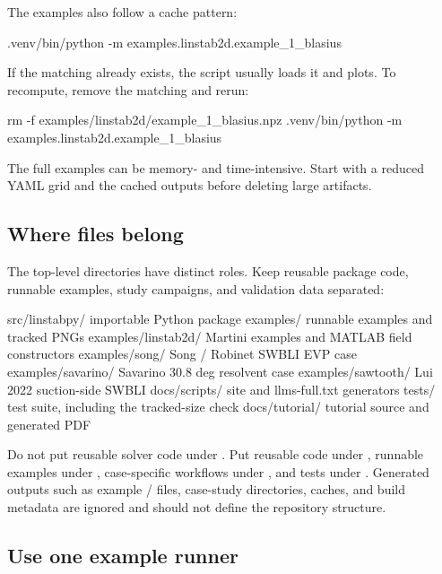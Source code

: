 \documentclass[11pt,a4paper]{article}
\newcommand{\code}[1]{\texttt{\detokenize{#1}}}
\begin{document}
The examples also follow a cache pattern:

\begin{commandbox}
.venv/bin/python -m examples.linstab2d.example_1_blasius
\end{commandbox}

If the matching \code{.npz} already exists, the script usually loads it and plots. To recompute, remove the matching \code{.npz} and rerun:

\begin{commandbox}
rm -f examples/linstab2d/example_1_blasius.npz
.venv/bin/python -m examples.linstab2d.example_1_blasius
\end{commandbox}

\begin{warningbox}
The full examples can be memory- and time-intensive. Start with a reduced YAML grid and the cached outputs before deleting large \code{.npz} artifacts.
\end{warningbox}

\subsection*{Where files belong}

The top-level directories have distinct roles. Keep reusable package code, runnable examples, study campaigns, and validation data separated:

\begin{outputbox}
src/linstabpy/      importable Python package
examples/           runnable examples and tracked PNGs
examples/linstab2d/   Martini examples and MATLAB field constructors
examples/song/      Song / Robinet SWBLI EVP case
examples/savarino/  Savarino 30.8 deg resolvent case
examples/sawtooth/  Lui 2022 suction-side SWBLI
docs/scripts/       site and llms-full.txt generators
tests/              test suite, including the tracked-size check
docs/tutorial/      tutorial source and generated PDF
\end{outputbox}

Do not put reusable solver code under . Put reusable code under , runnable examples under , case-specific workflows under , and tests under . Generated outputs such as example \code{.npz}/\code{.png} files, case-study  directories, caches, and build metadata are ignored and should not define the repository structure.

\subsection*{Use one example runner}
\end{document}
